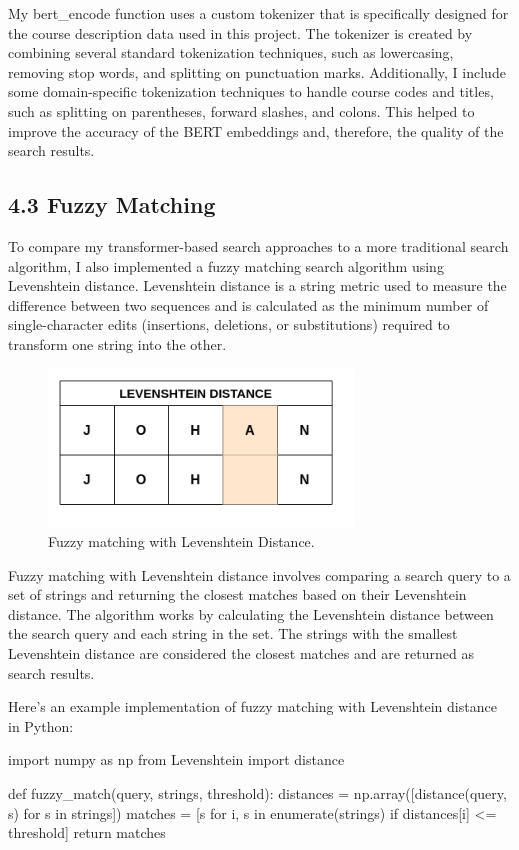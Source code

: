 \documentclass[
	a4paper, %
	10pt, %
	unnumberedsections, %
	twoside, %
]{LTJournalArticle}
\begin{document}
My bert\_encode function uses a custom tokenizer that is specifically designed for the course description data used in this project. The tokenizer is created by combining several standard tokenization techniques, such as lowercasing, removing stop words, and splitting on punctuation marks. Additionally, I include some domain-specific tokenization techniques to handle course codes and titles, such as splitting on parentheses, forward slashes, and colons. This helped to improve the accuracy of the BERT embeddings and, therefore, the quality of the search results.


\subsection{4.3 Fuzzy Matching}

To compare my transformer-based search approaches to a more traditional search algorithm, I also implemented a fuzzy matching search algorithm using Levenshtein distance. Levenshtein distance is a string metric used to measure the difference between two sequences and is calculated as the minimum number of single-character edits (insertions, deletions, or substitutions) required to transform one string into the other. 

\begin{figure}[h]
    \includegraphics[width=8.1cm]{fuzzy.png}
    \caption{Fuzzy matching with Levenshtein Distance.}
    \label{fig:fuzzy}
\end{figure}

Fuzzy matching with Levenshtein distance involves comparing a search query to a set of strings and returning the closest matches based on their Levenshtein distance. The algorithm works by calculating the Levenshtein distance between the search query and each string in the set. The strings with the smallest Levenshtein distance are considered the closest matches and are returned as search results.

Here's an example implementation of fuzzy matching with Levenshtein distance in Python:

\begin{python}
	import numpy as np
	from Levenshtein import distance

	def fuzzy_match(query, strings, threshold):
		distances = np.array([distance(query, s)
		 for s in strings])
		matches = [s for i, s in 
		enumerate(strings) if 
		distances[i] <= threshold]
		return matches
\end{python}
\end{document}
